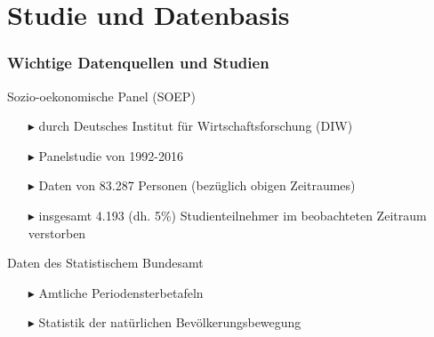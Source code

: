 \documentclass{beamer}
\begin{document}
\section{Studie und Datenbasis}
\begin{frame}
\frametitle{Wichtige Datenquellen und Studien}
  \begin{block}{Sozio-oekonomische Panel (SOEP)}
   \begin{itemize}
     \item [$\blacktriangleright$] durch Deutsches Institut für   Wirtschaftsforschung (DIW)
     \item [$\blacktriangleright$] Panelstudie von 1992-2016
     \item [$\blacktriangleright$] Daten von  83.287 Personen (bezüglich obigen Zeitraumes)
     \item[$\blacktriangleright$] insgesamt 4.193 (dh. 5\%) Studienteilnehmer im beobachteten Zeitraum verstorben
   \end{itemize}
  \end{block}
  \begin{block}{Daten des Statistischem Bundesamt}
   \begin{itemize}
     \item [$\blacktriangleright$] Amtliche Periodensterbetafeln
     \item [$\blacktriangleright$] Statistik der natürlichen Bevölkerungsbewegung
   \end{itemize}
  \end{block}
\end{frame}
\end{document}
